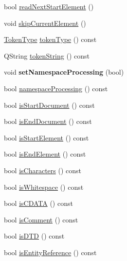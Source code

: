 \begin{DoxyCompactItemize}
\item 
bool \hyperlink{class_xml_stream_reader_acc156ff248a564ada18939f9382e0b05}{read\+Next\+Start\+Element} ()
\item 
void \hyperlink{class_xml_stream_reader_a3a0bd3dc7aca930af2a53591309f9e8e}{skip\+Current\+Element} ()
\item 
\hyperlink{class_xml_stream_reader_a99e2023f874f0ca648c996ae79c3b5f7}{Token\+Type} \hyperlink{class_xml_stream_reader_a2c26bfb63c27f2992e24f038d65c8c0a}{token\+Type} () const
\item 
Q\+String \hyperlink{class_xml_stream_reader_a7e60a09f7692db1fccc420573b56c68b}{token\+String} () const
\item 
\mbox{\label{class_xml_stream_reader_a0db32e3e8cfaa678a615973cc00967f2}} 
void {\bfseries set\+Namespace\+Processing} (bool)
\item 
bool \hyperlink{class_xml_stream_reader_ab834393cf21f28f8ae088b19033cacfa}{namespace\+Processing} () const
\item 
bool \hyperlink{class_xml_stream_reader_aa5a6f844839b4c7d893e3023f97feb4d}{is\+Start\+Document} () const
\item 
bool \hyperlink{class_xml_stream_reader_a855b760b7aeec5b7fb177a88d9e7caee}{is\+End\+Document} () const
\item 
bool \hyperlink{class_xml_stream_reader_a78cb57350cabab5e7ca7c1a8963a774d}{is\+Start\+Element} () const
\item 
bool \hyperlink{class_xml_stream_reader_a4262447470b01b9544d1e83bf9521b35}{is\+End\+Element} () const
\item 
bool \hyperlink{class_xml_stream_reader_a6d14d53c064bab08ac876ffaf2448742}{is\+Characters} () const
\item 
bool \hyperlink{class_xml_stream_reader_a15550b223a59978b612b0fc32bd543e1}{is\+Whitespace} () const
\item 
bool \hyperlink{class_xml_stream_reader_ad1c5f23d9c60ab41c032940191d71ae4}{is\+C\+D\+A\+TA} () const
\item 
bool \hyperlink{class_xml_stream_reader_ac3c807c55b3a957da46fe7c695cd7907}{is\+Comment} () const
\item 
bool \hyperlink{class_xml_stream_reader_afd7dc97a37491da500428da151ca4913}{is\+D\+TD} () const
\item 
bool \hyperlink{class_xml_stream_reader_ac7d9fbea5bf99934c5d862c8ced0d44f}{is\+Entity\+Reference} () const
\item 

\end{DoxyCompactItemize}
